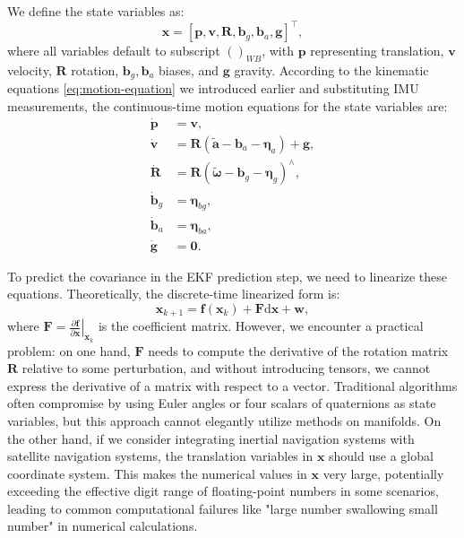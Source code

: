 We define the state variables as:
\begin{equation}\label{key}
	\mathbf{x} = [\mathbf{p}, \mathbf{v}, \mathbf{R}, \mathbf{b}_g, \mathbf{b}_a, \mathbf{g}]^\top,
\end{equation}
where all variables default to subscript $()_{WB}$, with $\mathbf{p}$ representing translation, $\mathbf{v}$ velocity, $\mathbf{R}$ rotation, $\mathbf{b}_g, \mathbf{b}_a$ biases, and $\mathbf{g}$ gravity. According to the kinematic equations \eqref{eq:motion-equation} we introduced earlier and substituting IMU measurements, the continuous-time motion equations for the state variables are:
\begin{subequations}\label{eq:ekf-continous}
	\begin{align}
		\dot{\mathbf{p}} &= \mathbf{v}, \\
		\dot{\mathbf{v}} &= \mathbf{R} (\tilde{\mathbf{a}} - \mathbf{b}_{a} - \boldsymbol{\eta}_a) + \mathbf{g}, \\
		\dot{\mathbf{R}} &= \mathbf{R} \left( \tilde{\boldsymbol{\omega}} - \mathbf{b}_{g} - \boldsymbol{\eta}_g 
		\right)^\wedge, \\
		\dot{\mathbf{b}}_{g} & = \boldsymbol{\eta}_{bg}, \\
		\dot{\mathbf{b}}_{a} & = \boldsymbol{\eta}_{ba}, \\ 
		\dot{\mathbf{g}} &= \mathbf{0}.
	\end{align}
\end{subequations}

To predict the covariance in the EKF prediction step, we need to linearize these equations. Theoretically, the discrete-time linearized form is:
\begin{equation}\label{key}
	\mathbf{x}_{k+1} = \mathbf{f} (\mathbf{x}_k) + \mathbf{F} \mathrm{d} \mathbf{x} + \mathbf{w},
\end{equation}
where $\mathbf{F} = \left. \frac{\partial \mathbf{f}}{\partial \mathbf{x}} \right|_{\mathbf{x}_{k}}$ is the coefficient matrix. However, we encounter a practical problem: on one hand, $\mathbf{F}$ needs to compute the derivative of the rotation matrix $\mathbf{R}$ relative to some perturbation, and without introducing tensors, we cannot express the derivative of a matrix with respect to a vector. Traditional algorithms often compromise by using Euler angles or four scalars of quaternions as state variables\cite{crassidis2006sigma}, but this approach cannot elegantly utilize methods on manifolds. On the other hand, if we consider integrating inertial navigation systems with satellite navigation systems, the translation variables in $\mathbf{x}$ should use a global coordinate system. This makes the numerical values in $\mathbf{x}$ very large, potentially exceeding the effective digit range of floating-point numbers in some scenarios, leading to common computational failures like "large number swallowing small number" in numerical calculations\cite{bonnans2006numerical}.


